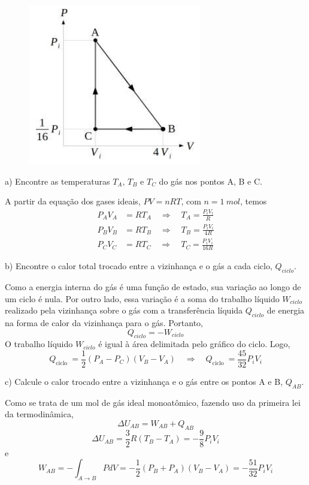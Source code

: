 \begin{enumerate}[start=1,label={\bfseries Q\arabic*.}]
\begin{figure}
  \centering
  \includegraphics[scale=1]{termica-img/gas.png}
\end{figure}


  a) Encontre as temperaturas $T_{A}$, $T_{B}$ e $T_{C}$ do gás nos pontos A, B e C.

\resposta A partir da equação dos gases ideais, $PV = nRT$, com $n = 1\ mol$, temos
$$
\begin{aligned}
P_{A} V_{A} &=R T_{A} \quad \Rightarrow \quad T_{A}=\frac{P_{i} V_{i}}{R} \\
P_{B} V_{B} &=R T_{B} \quad \Rightarrow \quad T_{B}=\frac{P_{i} V_{i}}{4 R} \\
P_{C} V_{C} &=R T_{C} \quad \Rightarrow \quad T_{C}=\frac{P_{i} V_{i}}{16 R}
\end{aligned}
$$


b) Encontre o calor total trocado entre a vizinhança e o gás a cada ciclo, $Q_{ciclo}$.

\resposta Como a energia interna do gás é uma função de estado, sua variação ao longo de um ciclo é nula. Por outro lado, essa variação é a soma do trabalho líquido $W_{ciclo}$ realizado pela vizinhança sobre o gás com a transferência líquida $Q_{ciclo}$ de energia na forma de calor da vizinhança para
o gás. Portanto,
$$
Q_{ciclo} = - W_{ciclo}
$$
O trabalho líquido $W_{ciclo}$ é igual à área delimitada pelo gráfico do ciclo. Logo,
$$
Q_{\text {ciclo }}=\frac{1}{2}\left(P_{A}-P_{C}\right)\left(V_{B}-V_{A}\right) \quad \Rightarrow \quad Q_{\text {ciclo }}=\frac{45}{32} P_{i} V_{i}
$$




c) Calcule o calor trocado entre a vizinhança e o gás entre os pontos A e B, $Q_{AB}$.

\resposta Como se trata de um mol de gás ideal monoatômico, fazendo uso da primeira lei da termodinâmica,
$$
\Delta U_{A B}=W_{A B}+Q_{A B}
$$
$$
\Delta U_{A B}=\frac{3}{2} R\left(T_{B}-T_{A}\right)=-\frac{9}{8} P_{i} V_{i}
$$
e
$$
W_{A B}=-\int_{A \rightarrow B} P d V=-\frac{1}{2}\left(P_{B}+P_{A}\right)\left(V_{B}-V_{A}\right)=-\frac{51}{32} P_{i} V_{i}
$$




\end{enumerate}
